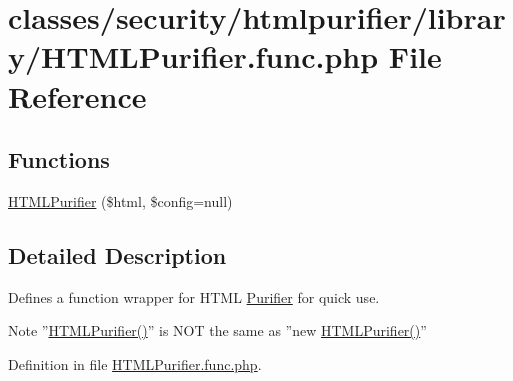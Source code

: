 \hypertarget{HTMLPurifier_8func_8php}{\section{classes/security/htmlpurifier/library/\+H\+T\+M\+L\+Purifier.func.\+php File Reference}
\label{HTMLPurifier_8func_8php}
}
\subsection*{Functions}
\begin{DoxyCompactItemize}
\item 
\hyperlink{HTMLPurifier_8func_8php_a9cbaed512b3193663ebf1f6850f1e654}{H\+T\+M\+L\+Purifier} (\$html, \$config=null)
\end{DoxyCompactItemize}


\subsection{Detailed Description}
Defines a function wrapper for H\+T\+M\+L \hyperlink{classPurifier}{Purifier} for quick use. \begin{DoxyNote}{Note}
''\hyperlink{HTMLPurifier_8func_8php_a9cbaed512b3193663ebf1f6850f1e654}{H\+T\+M\+L\+Purifier()}'' is N\+O\+T the same as ''new \hyperlink{HTMLPurifier_8func_8php_a9cbaed512b3193663ebf1f6850f1e654}{H\+T\+M\+L\+Purifier()}'' 
\end{DoxyNote}


Definition in file \hyperlink{HTMLPurifier_8func_8php_source}{H\+T\+M\+L\+Purifier.\+func.\+php}.



